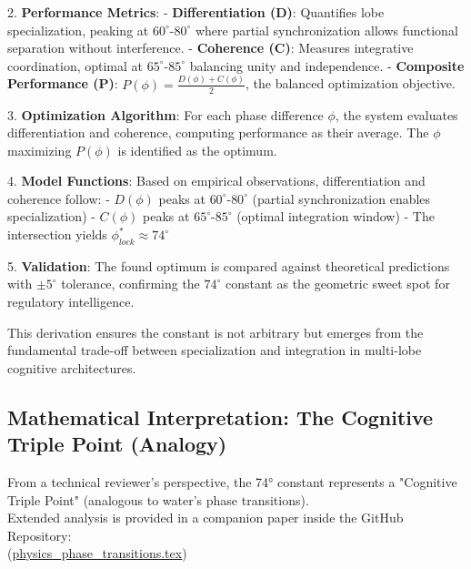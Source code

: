 \documentclass[12pt,a4paper]{report}
\begin{document}
2. \textbf{Performance Metrics}:
   - \textbf{Differentiation (D)}: Quantifies lobe specialization, peaking at $60^\circ$-$80^\circ$ where partial synchronization allows functional separation without interference.
   - \textbf{Coherence (C)}: Measures integrative coordination, optimal at $65^\circ$-$85^\circ$ balancing unity and independence.
   - \textbf{Composite Performance (P)}: $P(\phi) = \frac{D(\phi) + C(\phi)}{2}$, the balanced optimization objective.

3. \textbf{Optimization Algorithm}: For each phase difference $\phi$, the system evaluates differentiation and coherence, computing performance as their average. The $\phi$ maximizing $P(\phi)$ is identified as the optimum.

4. \textbf{Model Functions}: Based on empirical observations, differentiation and coherence follow:
   - $D(\phi)$ peaks at $60^\circ$-$80^\circ$ (partial synchronization enables specialization)
   - $C(\phi)$ peaks at $65^\circ$-$85^\circ$ (optimal integration window)
   - The intersection yields $\phi_{lock}^* \approx 74^\circ$

5. \textbf{Validation}: The found optimum is compared against theoretical predictions with $\pm 5^\circ$ tolerance, confirming the $74^\circ$ constant as the geometric sweet spot for regulatory intelligence.

This derivation ensures the constant is not arbitrary but emerges from the fundamental trade-off between specialization and integration in multi-lobe cognitive architectures.

\subsection{Mathematical Interpretation: The Cognitive Triple Point (Analogy)}

From a technical reviewer's perspective, the 74° constant represents a "Cognitive Triple Point" (analogous to water's phase transitions). \\
Extended analysis is provided in a companion paper inside the GitHub Repository: \\
{\small (\href{https://github.com/jhcragin/SpiralBrain-v3.0-public/blob/main/papers/physics_phase_transitions/physics_phase_transitions.tex}{physics\_phase\_transitions.tex})}
\end{document}
